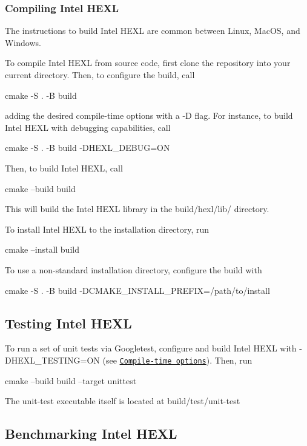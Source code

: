 \subsubsection*{Compiling Intel H\+E\+XL}

The instructions to build Intel H\+E\+XL are common between Linux, Mac\+OS, and Windows.

To compile Intel H\+E\+XL from source code, first clone the repository into your current directory. Then, to configure the build, call 
\begin{DoxyCode}
cmake -S . -B build
\end{DoxyCode}
 adding the desired compile-\/time options with a {\ttfamily -\/D} flag. For instance, to build Intel H\+E\+XL with debugging capabilities, call 
\begin{DoxyCode}
cmake -S . -B build -DHEXL\_DEBUG=ON
\end{DoxyCode}


Then, to build Intel H\+E\+XL, call 
\begin{DoxyCode}
cmake --build build
\end{DoxyCode}
 This will build the Intel H\+E\+XL library in the {\ttfamily build/hexl/lib/} directory.

To install Intel H\+E\+XL to the installation directory, run 
\begin{DoxyCode}
cmake --install build
\end{DoxyCode}
 To use a non-\/standard installation directory, configure the build with 
\begin{DoxyCode}
cmake -S . -B build -DCMAKE\_INSTALL\_PREFIX=/path/to/install
\end{DoxyCode}


\subsection*{Testing Intel H\+E\+XL}

To run a set of unit tests via Googletest, configure and build Intel H\+E\+XL with {\ttfamily -\/\+D\+H\+E\+X\+L\+\_\+\+T\+E\+S\+T\+I\+NG=ON} (see \href{#compile-time-options}{\tt Compile-\/time options}). Then, run 
\begin{DoxyCode}
cmake --build build --target unittest
\end{DoxyCode}
 The unit-\/test executable itself is located at {\ttfamily build/test/unit-\/test} \subsection*{Benchmarking Intel H\+E\+XL}

